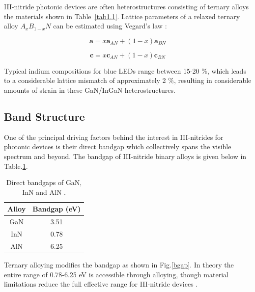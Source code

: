 III-nitride photonic devices are often heterostructures consisting of ternary alloys the materials shown in Table~\ref{tab1.1}. Lattice parameters of a relaxed ternary alloy $A_{x}B_{1-x}N$ can be estimated using Vegard's law \cite{Vickers2003}:

\begin{equation}
\mathbf{a} = x \mathbf{a}_{AN} + (1-x)\mathbf{a}_{BN}
\end{equation}

\begin{equation}
\mathbf{c} = x \mathbf{c}_{AN} + (1-x)\mathbf{c}_{BN}
\end{equation}

Typical indium compositions for blue LEDs range between 15-20 $\%$, which leads to a considerable lattice mismatch of approximately 2 $\%$, resulting in considerable amounts of strain in these GaN/InGaN heterostructures.

\subsection{Band Structure} 
\label{section1.1.2}

One of the principal driving factors behind the interest in III-nitrides for photonic devices is their direct bandgap which collectively spans the visible spectrum and beyond. The bandgap of III-nitride binary alloys is given below in Table.\ref{tab1.2}.

\begin{table}[!htb]
	\centering
	\begin{tabular}{cc}
		Alloy & Bandgap (eV) \\
		\hline\hline
		GaN   & 3.51 \\
		InN   & 0.78 \\
		AlN   & 6.25  \\ 
		\hline
	\end{tabular}
	\caption{Direct bandgaps of GaN, InN and AlN \cite{Vurgaftman2003}.}
	\label{tab1.2}
\end{table}

Ternary alloying modifies the bandgap as shown in Fig.\ref{bgap}. In theory the entire range of 0.78-6.25 eV is accessible through alloying, though material limitations reduce the full effective range for III-nitride devices \cite{Scholz2012}.

